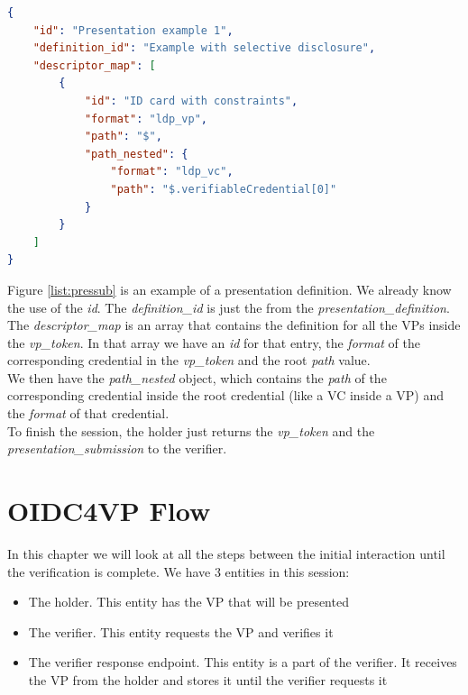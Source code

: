 \documentclass[
	a4paper               %
	,BCOR=0mm            %
	,bibliography=totoc   %
	,listof=totoc         %
	,monolingual
	,twoside=false
]{bfhthesis}              %
\begin{document}
\begin{lstlisting}[language=json,firstnumber=1,caption={Example of a presentation submission},captionpos=b, label={list:pressub}]
{
	"id": "Presentation example 1",
	"definition_id": "Example with selective disclosure",
	"descriptor_map": [
		{
			"id": "ID card with constraints",
			"format": "ldp_vp",
			"path": "$",
			"path_nested": {
				"format": "ldp_vc",
				"path": "$.verifiableCredential[0]"
			}
		}
	]
}
\end{lstlisting}

Figure \ref{list:pressub} is an example of a presentation definition. We already know the use of the \textit{id}. The \textit{definition\_id} is just the  from the \textit{presentation\_definition}.
The \textit{descriptor\_map} is an array that contains the definition for all the VPs inside the \textit{vp\_token}.
In that array we have an \textit{id} for that entry, the \textit{format} of the corresponding credential in the \textit{vp\_token} and the root \textit{path} value.\\
We then have the \textit{path\_nested} object, which contains the \textit{path} of the corresponding credential inside the root credential (like a VC inside a VP) and the   \textit{format} of that credential.\\

To finish the session, the holder just returns the \textit{vp\_token} and the \textit{presentation\_submission} to the verifier.

\section{OIDC4VP Flow}
In this chapter we will look at all the steps between the initial interaction until the verification is complete.
We have 3 entities in this session:
\begin{itemize}
	\item The holder. This entity has the VP that will be presented
	\item The verifier. This entity requests the VP and verifies it
	\item The verifier response endpoint. This entity is a part of the verifier. It receives the VP from the holder and stores it until the verifier requests it
\end{itemize}
\end{document}
